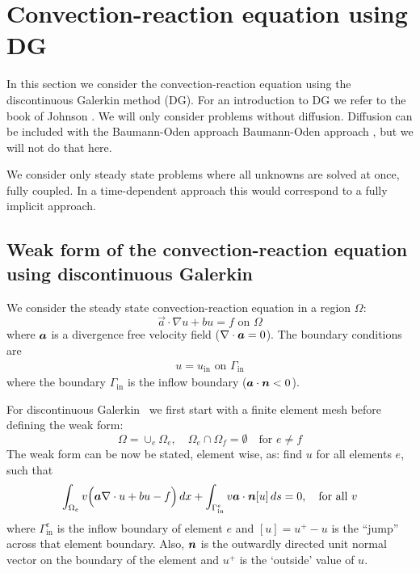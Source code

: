 
\def\headdate{1st June 2007}

\section{Convection-reaction equation using DG}

In this section we consider the convection-reaction equation using the
discontinuous Galerkin method (DG).
For an introduction to DG we refer to the 
book of Johnson \cite{Johnson87}.
We will only consider problems without diffusion. Diffusion can
be included with the Baumann-Oden approach
Baumann-Oden approach \cite{Baumann99}, but we will not do that here.

We consider only steady
state problems where all unknowns are solved at once, fully coupled. In a
time-dependent
approach this would correspond to a fully implicit approach.

\subsection{Weak form of the convection-reaction equation using discontinuous
 Galerkin \fem}

We consider the steady state convection-reaction equation in a region $\Omega$:
\begin{equation}
     \vec a\cdot\nabla u + b u = f\text{ on }\Omega
\end{equation}
where $\boldsymbol{a}$ is a divergence free velocity field ($\nabla\cdot\boldsymbol{a}=0$).
The boundary conditions are
\begin{gather}
    u = u_\text{in}\text{ on }\Gamma_\text{in}
\end{gather}
where the boundary $\Gamma_\text{in}$ is the inflow boundary ($\boldsymbol{a}\cdot\boldsymbol{n}<0$).

For discontinuous Galerkin \fem\ we first start with a finite element mesh
before defining the weak form:
\[
\Omega=\cup_e\Omega_e, \quad\Omega_{e}\cap\Omega_{f}=\emptyset\quad
   \text{for }e\neq f
\]
The weak form can be now be stated, element wise, as:
find $u$ for all elements $e$, such that
\begin{equation}
 \int_{\Omega_e}v\Big(\boldsymbol{a}\nabla\cdot u+bu-f\Big)\,d x
    +\int_{\Gamma^e_{\text{in}}}v\boldsymbol{a}\cdot\boldsymbol{n}[u]\,d s=0,
        \quad\text{for all }v 
   \label{eq:DGweak}
\end{equation}
where $\Gamma^e_{\text{in}}$ is the inflow boundary of element $e$ and
$[u]=u^+-u$ is the ``jump'' across that element boundary. Also, $\boldsymbol{n}$ is the outwardly directed unit normal vector on the boundary of
the element and $u^+$ is
the `outside' value of $u$.

